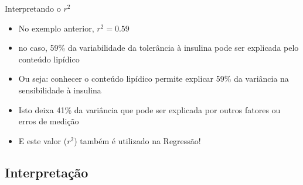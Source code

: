 \documentclass{beamer}
\begin{document}
\begin{frame}{Interpretando o $r^2$}
  \begin{itemize}
  \item No exemplo anterior, $r^2 = 0.59$
  \item no caso, 59\% da variabilidade da tolerância à insulina pode
    ser explicada pelo conteúdo lipídico
  \item Ou seja: conhecer o conteúdo lipídico permite explicar 59\%
    da variância na sensibilidade à insulina
  \item Isto deixa 41\% da variância que pode ser explicada por outros
    fatores ou erros de medição
  \item E este valor ($r^2$) também é utilizado na Regressão!
  \end{itemize}
\end{frame}


    

    


\subsection{Interpretação}
\end{document}
